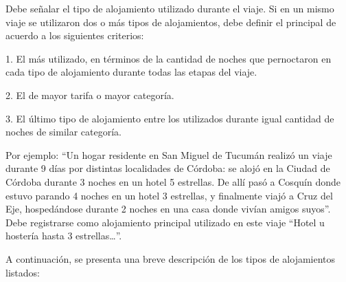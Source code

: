 \documentclass[
  openany]{book}
\begin{document}
Debe señalar el tipo de alojamiento utilizado durante el viaje. Si en un mismo viaje se utilizaron dos o más tipos de alojamientos, debe definir el principal de acuerdo a los siguientes criterios:

1. El más utilizado, en términos de la cantidad de noches que pernoctaron en cada tipo de alojamiento durante todas las etapas del viaje.

2. El de mayor tarifa o mayor categoría.

3. El último tipo de alojamiento entre los utilizados durante igual cantidad de noches de similar categoría.

Por ejemplo: ``Un hogar residente en San Miguel de Tucumán realizó un viaje durante 9 días por distintas localidades de Córdoba: se alojó en la Ciudad de Córdoba durante 3 noches en un hotel 5 estrellas. De allí pasó a Cosquín donde estuvo parando 4 noches en un hotel 3 estrellas, y finalmente viajó a Cruz del Eje, hospedándose durante 2 noches en una casa donde vivían amigos suyos''. Debe registrarse como alojamiento principal utilizado en este viaje ``Hotel u hostería hasta 3 estrellas\ldots{}''.

A continuación, se presenta una breve descripción de los tipos de alojamientos listados:
\end{document}
